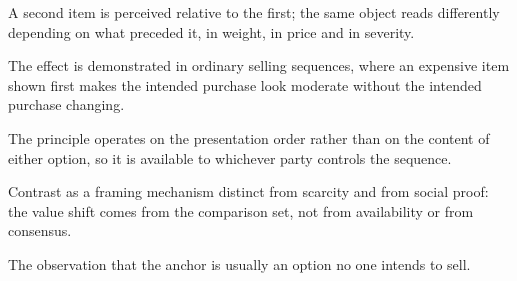 

\begin{distilled}
  \item A second item is perceived relative to the first; the same object reads differently depending on what preceded it, in weight, in price and in severity.
  \item The effect is demonstrated in ordinary selling sequences, where an expensive item shown first makes the intended purchase look moderate without the intended purchase changing.
  \item The principle operates on the presentation order rather than on the content of either option, so it is available to whichever party controls the sequence.
\end{distilled}

\begin{unique}
  \item Contrast as a framing mechanism distinct from scarcity and from social proof: the value shift comes from the comparison set, not from availability or from consensus.
  \item The observation that the anchor is usually an option no one intends to sell.
\end{unique}
